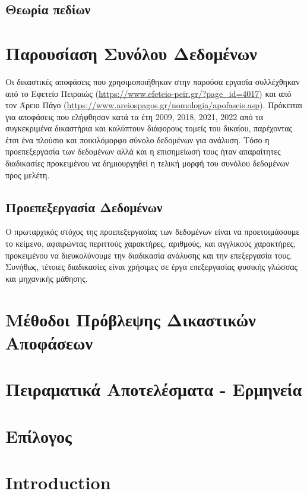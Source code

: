 \documentclass[diploma]{softlab-thesis}
\begin{document}
\section{Θεωρία πεδίων}


\chapter{Παρουσίαση Συνόλου Δεδομένων}

Οι δικαστικές αποφάσεις που χρησιμοποιήθηκαν στην παρούσα εργασία συλλέχθηκαν από το Εφετείο Πειραιώς (\url{https://www.efeteio-peir.gr/?page_id=4017}) και από τον Άρειο Πάγο (\url{https://www.areiospagos.gr/nomologia/apofaseis.asp}). Πρόκειται για αποφάσεις που ελήφθησαν κατά τα έτη 2009, 2018, 2021, 2022 από τα συγκεκριμένα δικαστήρια και καλύπτουν διάφορους τομείς του δικαίου, παρέχοντας έτσι ένα πλούσιο και ποικιλόμορφο σύνολο δεδομένων για ανάλυση. Τόσο η προεπεξεργασία των δεδομένων αλλά και η επισημείωσή τους ήταν απαραίτητες διαδικασίες προκειμένου να δημιουργηθεί η τελική μορφή του συνόλου δεδομένων προς μελέτη.

\section{Προεπεξεργασία Δεδομένων}

Ο πρωταρχικός στόχος της προεπεξεργασίας των δεδομένων είναι να προετοιμάσουμε το κείμενο, αφαιρώντας περιττούς χαρακτήρες, αριθμούς, και αγγλικούς χαρακτήρες, προκειμένου να διευκολύνουμε την διαδικασία ανάλυσης και την επεξεργασία τους. Συνήθως, τέτοιες διαδικασίες είναι χρήσιμες σε έργα επεξεργασίας φυσικής γλώσσας και μηχανικής μάθησης.




\chapter{Μέθοδοι Πρόβλεψης  Δικαστικών Αποφάσεων}

\chapter{Πειραματικά Αποτελέσματα - Ερμηνεία}

\chapter{Επίλογος}

\englishtext

\chapter{Introduction}
\end{document}
